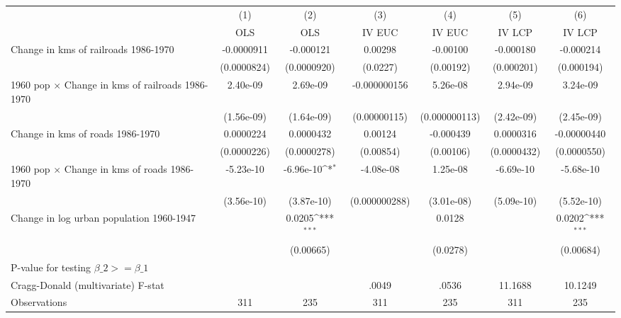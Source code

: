 {
\def\sym#1{\ifmmode^{#1}\else\(^{#1}\)\fi}
\begin{tabular}{l*{6}{c}}
\hline\hline
                &\multicolumn{1}{c}{(1)}&\multicolumn{1}{c}{(2)}&\multicolumn{1}{c}{(3)}&\multicolumn{1}{c}{(4)}&\multicolumn{1}{c}{(5)}&\multicolumn{1}{c}{(6)}\\
                &\multicolumn{1}{c}{OLS}&\multicolumn{1}{c}{OLS}&\multicolumn{1}{c}{IV EUC}&\multicolumn{1}{c}{IV EUC}&\multicolumn{1}{c}{IV LCP}&\multicolumn{1}{c}{IV LCP}\\
\hline
Change in kms of railroads 1986-1970&-0.0000911         &-0.000121         &  0.00298         & -0.00100         &-0.000180         &-0.000214         \\
                &(0.0000824)         &(0.0000920)         & (0.0227)         &(0.00192)         &(0.000201)         &(0.000194)         \\
[1em]
1960 pop $\times$ Change in kms of railroads 1986-1970& 2.40e-09         & 2.69e-09         &-0.000000156         & 5.26e-08         & 2.94e-09         & 3.24e-09         \\
                &(1.56e-09)         &(1.64e-09)         &(0.00000115)         &(0.000000113)         &(2.42e-09)         &(2.45e-09)         \\
[1em]
Change in kms of roads 1986-1970&0.0000224         &0.0000432         &  0.00124         &-0.000439         &0.0000316         &-0.00000440         \\
                &(0.0000226)         &(0.0000278)         &(0.00854)         &(0.00106)         &(0.0000432)         &(0.0000550)         \\
[1em]
1960 pop $\times$ Change in kms of roads 1986-1970&-5.23e-10         &-6.96e-10\sym{*}  &-4.08e-08         & 1.25e-08         &-6.69e-10         &-5.68e-10         \\
                &(3.56e-10)         &(3.87e-10)         &(0.000000288)         &(3.01e-08)         &(5.09e-10)         &(5.52e-10)         \\
[1em]
Change in log urban population 1960-1947&                  &   0.0205\sym{***}&                  &   0.0128         &                  &   0.0202\sym{***}\\
                &                  &(0.00665)         &                  & (0.0278)         &                  &(0.00684)         \\
\hline
P-value for testing $\beta\_{2} >= \beta\_{1}$&                  &                  &                  &                  &                  &                  \\
Cragg-Donald (multivariate) F-stat&                  &                  &    .0049         &    .0536         &  11.1688         &  10.1249         \\
Observations    &      311         &      235         &      311         &      235         &      311         &      235         \\
\hline\hline
\end{tabular}
}
